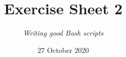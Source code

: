 




\title{{\vspace{-12mm}\huge\textbf{Exercise Sheet 2}}}
\author{\textit{Writing good Bash scripts}}
\date{{\small 27 October 2020}}


    \maketitle
    \bigskip
    
    \bigskip
    
    \bigskip
    
    \newpage
    
    \newpage
    
    \bigskip
    
